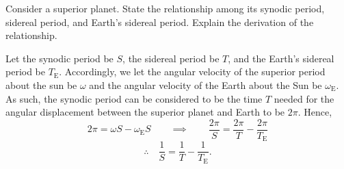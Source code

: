 \documentclass[main.tex]{subfiles}
\begin{document}
\begin{q}{2}
Consider a superior planet. State the relationship among its synodic period,
sidereal period, and Earth's sidereal period. Explain the derivation of the
relationship.
\end{q}

\begin{sol}
Let the synodic period be $S$, the sidereal period be $T$, and the Earth's
sidereal period be $T_{\text{E}}$. Accordingly, we let the angular velocity of the superior period about the sun be $\omega$ and the angular velocity of the Earth about the Sun be $\omega_{\text{E}}$. As such, the synodic period can be considered to be the time $T$ needed for the angular displacement between the superior planet and Earth to be $2\pi$. Hence,
\begin{equation}
    2\pi = \omega S - \omega_{\text{E}}S\qquad \implies \qquad\frac{2\pi}{S} = \frac{2\pi}{T} - \frac{2\pi}{T_{\text{E}}}
\end{equation}
\begin{equation}
    \therefore\quad\frac{1}{S} = \frac{1}{T} - \frac{1}{T_{\text{E}}}.
\end{equation}
\end{sol}
\end{document}
